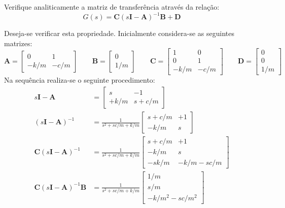 \documentclass{article}
\begin{document}
\newpage\begin{exercise}\label{ex8}
    Verifique analiticamente a matriz de transferência através da relação:
    \begin{equation}
        \boxed{G(s) = \mathbf{C}(s\mathbf{I} - \mathbf{A})^{-1} \mathbf{B} + \mathbf{D}}
    \end{equation}
\end{exercise}
\begin{resolution}
    Deseja-se verificar esta propriedade. Inicialmente considera-se as seguintes matrizes:
    \begin{equation*}
        \mathbf{A} = \begin{bmatrix} 0 & 1\\ -k/m & -c/m\end{bmatrix}
        \qquad
        \mathbf{B} = \begin{bmatrix} 0\\ 1/m \end{bmatrix}
        \qquad
        \mathbf{C} = \begin{bmatrix} 1 & 0\\ 0 & 1\\ -k/m & -c/m\end{bmatrix}
        \qquad
        \mathbf{D} = \begin{bmatrix} 0\\ 0\\ 1/m \end{bmatrix}
    \end{equation*}
    Na sequência realiza-se o seguinte procedimento:
    \begin{align*}
        s\mathbf{I} - \mathbf{A} &= \begin{bmatrix} s & -1\\ +k/m & s+c/m\end{bmatrix}\\
        (s\mathbf{I} - \mathbf{A})^{-1} &= \frac{1}{s^2 + s c/m + k/m}\begin{bmatrix} s + c/m & +1\\ -k/m & s\end{bmatrix}\\
        \mathbf{C}(s\mathbf{I} - \mathbf{A})^{-1} &= \frac{1}{s^2 + s c/m + k/m}\begin{bmatrix} s + c/m & +1\\ -k/m & s\\ -s k/m & -k/m - s c/m\end{bmatrix}\\
        \mathbf{C}(s\mathbf{I} - \mathbf{A})^{-1}\mathbf{B} &= \frac{1}{s^2 + s c/m + k/m}\begin{bmatrix} 1/m\\ s/m\\ -k/m^2 -sc/m^2\end{bmatrix}\\

\end{align*}
\end{resolution}
\end{document}
